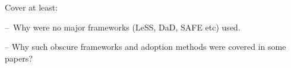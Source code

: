 Cover at least:

– Why were no major frameworks (LeSS, DaD, SAFE etc) used.


– Why such obscure frameworks and adoption methods were covered in some papers?
